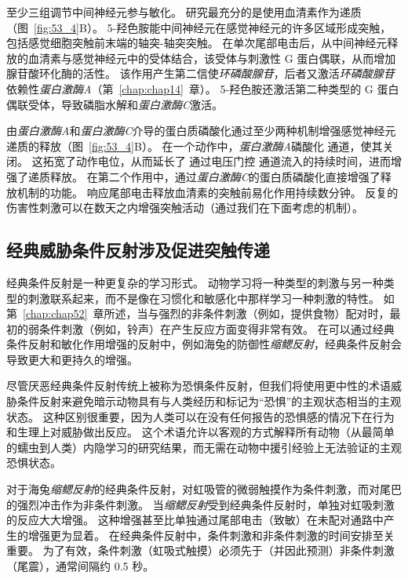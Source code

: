至少三组调节中间神经元参与敏化。
研究最充分的是使用血清素作为递质（图~\ref{fig:53_4}B）。
5-羟色胺能中间神经元在感觉神经元的许多区域形成突触，包括感觉细胞突触前末端的轴突-轴突突触。
在单次尾部电击后，从中间神经元释放的血清素与感觉神经元中的受体结合，该受体与刺激性 G 蛋白偶联，从而增加腺苷酸环化酶的活性。
该作用产生第二信使\textit{环磷酸腺苷}，后者又激活\textit{环磷酸腺苷}依赖性\textit{蛋白激酶A}（第~\ref{chap:chap14}~章）。
5-羟色胺还激活第二种类型的 G 蛋白偶联受体，导致磷脂水解和\textit{蛋白激酶C}激活。


由\textit{蛋白激酶A}和\textit{蛋白激酶C}介导的蛋白质磷酸化通过至少两种机制增强感觉神经元递质的释放（图~\ref{fig:53_4}B）。
在一个动作中，\textit{蛋白激酶A}磷酸化  通道，使其关闭。 这拓宽了动作电位，从而延长了  通过电压门控  通道流入的持续时间，进而增强了递质释放。
在第二个作用中，通过\textit{蛋白激酶C}的蛋白质磷酸化直接增强了释放机制的功能。
响应尾部电击释放血清素的突触前易化作用持续数分钟。
反复的伤害性刺激可以在数天之内增强突触活动（通过我们在下面考虑的机制）。



\subsection{经典威胁条件反射涉及促进突触传递}

经典条件反射是一种更复杂的学习形式。
动物学习将一种类型的刺激与另一种类型的刺激联系起来，而不是像在习惯化和敏感化中那样学习一种刺激的特性。
如第~\ref{chap:chap52}~章所述，当与强烈的非条件刺激（例如，提供食物）配对时，最初的弱条件刺激（例如，铃声）在产生反应方面变得非常有效。
在可以通过经典条件反射和敏化作用增强的反射中，例如海兔的防御性\textit{缩鳃反射}，经典条件反射会导致更大和更持久的增强。


尽管厌恶经典条件反射传统上被称为恐惧条件反射，但我们将使用更中性的术语威胁条件反射来避免暗示动物具有与人类经历和标记为“恐惧”的主观状态相当的主观状态。 这种区别很重要，因为人类可以在没有任何报告的恐惧感的情况下在行为和生理上对威胁做出反应。
这个术语允许以客观的方式解释所有动物（从最简单的蠕虫到人类）内隐学习的研究结果，而无需在动物中援引经验上无法验证的主观恐惧状态。


对于海兔\textit{缩鳃反射}的经典条件反射，对虹吸管的微弱触摸作为条件刺激，而对尾巴的强烈冲击作为非条件刺激。
当\textit{缩鳃反射}受到经典条件反射时，单独对虹吸刺激的反应大大增强。
这种增强甚至比单独通过尾部电击（致敏）在未配对通路中产生的增强更为显着。 
在经典条件反射中，条件刺激和非条件刺激的时间安排至关重要。
为了有效，条件刺激（虹吸式触摸）必须先于（并因此预测）非条件刺激（尾震），通常间隔约 0.5 秒。


